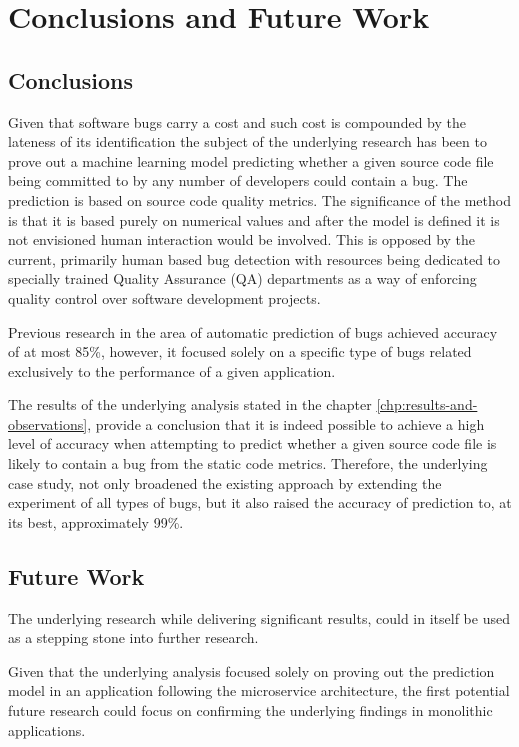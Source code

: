\chapter{Conclusions and Future Work}\label{chp:conclusions-and-future-work}
\section{Conclusions}\label{sec:conlclusions}
Given that software bugs carry a cost and such cost is compounded by the lateness of its identification\cite{autoDetectionOfPerfBugs} the subject of the underlying research has been to prove out a machine learning model predicting whether a given source code file being committed to by any number of developers could contain a bug. The prediction is based on source code quality metrics. The significance of the method is that it is based purely on numerical values and after the model is defined it is not envisioned human interaction would be involved. This is opposed by the current, primarily human based bug detection with resources being dedicated to specially trained Quality Assurance (QA) departments as a way of enforcing quality control over software development projects. 

Previous research in the area of automatic prediction of bugs \cite{autoDetectionOfPerfBugs} achieved accuracy of at most 85\%, however, it focused solely on a specific type of bugs related exclusively to the performance of a given application. 

The results of the underlying analysis stated in the chapter \ref{chp:results-and-observations}, provide a conclusion that it is indeed possible to achieve a high level of accuracy when attempting to predict whether a given source code file is likely to contain a bug from the static code metrics. Therefore, the underlying case study, not only broadened the existing approach by extending the experiment of all types of bugs, but it also raised the accuracy of prediction to, at its best, approximately 99\%.


\section{Future Work}\label{sec:future-work}
The underlying research while delivering significant results, could in itself be used as a stepping stone into further research.

Given that the underlying analysis focused solely on proving out the prediction model in an application following the microservice architecture, the first potential future research could focus on confirming the underlying findings in monolithic applications. 

